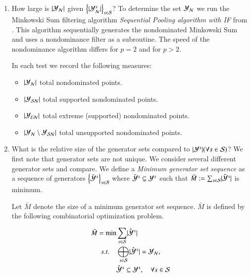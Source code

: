 \begin{enumerate}
	\item  How large is $\lvert \mathcal{Y}_{\mathcal{N}} \rvert$ given $\left\{\lvert \mathcal{Y}_{\mathcal{N}}^s \rvert \right\}_{s \in \mathcal{S}}$?
To determine the set $\mathcal{Y}_{\mathcal{N}}$ we run the Minkowski Sum filtering algorithm \emph{Sequential Pooling algorithm with IF} from \citep[Algorithm 1]{Kerberenes2022}. This algorithm sequentially generates the nondominated Minkowski Sum and uses a nondominance filter as a subroutine. The speed of the nondominance algorithm differs for $p=2$ and for $p>2$.

In each test we record the following measures:
\begin{itemize}
	\item 
$\lvert \mathcal{Y}_{\mathcal{N}} \rvert$ total nondominated points.
	\item 
$\lvert \mathcal{Y}_{\mathcal{SN}} \rvert$ total supported nondominated points.
	\item 
$\lvert \mathcal{Y}_{\mathcal{EN}} \rvert$ total extreme (supported) nondominated points.
	\item 
$\lvert \mathcal{Y}_{\mathcal{N}} \setminus \mathcal{Y}_{\mathcal{SN}} \rvert$ total unsupported nondominated points.
\end{itemize}



\item What is the relative size of the generator sets compared to $\lvert \mathcal{Y}^s \rvert (\forall s \in \mathcal{S})$?
We first note that generator sets are not unique. We consider several different generator sets and compare. We define a \emph{Minimum generator set sequence} as a sequence of generators $\left\{ \bar{\mathcal{Y}}^{s}  \right\}_{s \in \mathcal{S}}$ where $\bar{\mathcal{Y}}^{s} \subseteq \mathcal{Y}^s$ such that $\bar{M} := \sum_{s \in \mathcal{S}} \lvert \bar{\mathcal{Y}}^{s} \rvert$ is minimum.

Let $\bar{M}$ denote the size of a minimum generator set sequence. $\bar{M}$ is defined by the following combinatorial optimization problem.

\begin{align}
	\bar{M}  =  \min& \sum_{s \in \mathcal{S}} \lvert \hat{\mathcal{Y}}^s \rvert  \\
	s.t. \quad & \bigoplus_{s \in \mathcal{S}} \lvert \hat{\mathcal{Y}}^s \rvert = \mathcal{Y}_{\mathcal{N}},  \label{constr:comb spanning}\\
		   & \hat{\mathcal{Y}}^s \subseteq \mathcal{Y}^s, \quad \forall s \in \mathcal{S}
\end{align}


\end{enumerate}
